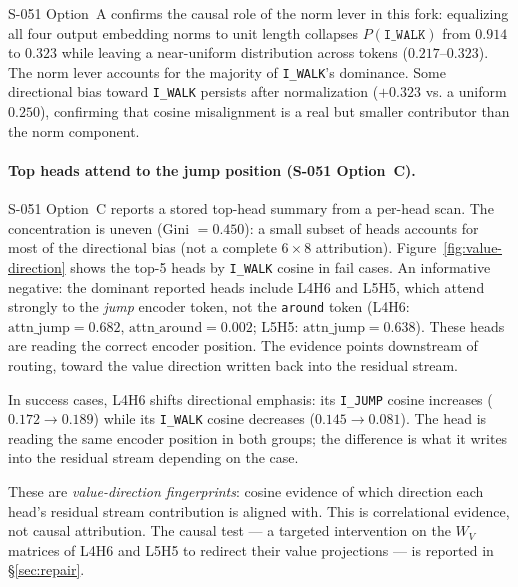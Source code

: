 S-051 Option~A confirms the causal role of the norm lever in this fork:
equalizing all four output embedding norms to unit length collapses
$P(\texttt{I\_WALK})$ from $0.914$ to $0.323$ while leaving a near-uniform
distribution across tokens ($0.217$--$0.323$).
The norm lever accounts for the majority of \texttt{I\_WALK}'s dominance.
Some directional bias toward \texttt{I\_WALK} persists after normalization
($+0.323$ vs. a uniform $0.250$), confirming that cosine misalignment is a
real but smaller contributor than the norm component.

\paragraph{Top heads attend to the jump position (S-051 Option~C).}
S-051 Option~C reports a stored top-head summary from a per-head scan.
The concentration is uneven (Gini $= 0.450$): a small subset of heads accounts
for most of the directional bias (not a complete $6{\times}8$ attribution).
Figure~\ref{fig:value-direction} shows the top-5 heads by \texttt{I\_WALK}
cosine in fail cases.
An informative negative: the dominant reported heads include L4H6 and L5H5, which
attend strongly to the \emph{jump} encoder token, not the \texttt{around} token
(L4H6: $\text{attn\_jump} = 0.682$, $\text{attn\_around} = 0.002$;
L5H5: $\text{attn\_jump} = 0.638$).
These heads are reading the correct encoder position.
The evidence points downstream of routing, toward the value direction written back
into the residual stream.

In success cases, L4H6 shifts directional emphasis: its \texttt{I\_JUMP} cosine
increases ($0.172 \to 0.189$) while its \texttt{I\_WALK} cosine decreases
($0.145 \to 0.081$).
The head is reading the same encoder position in both groups; the difference is
what it writes into the residual stream depending on the case.

These are \emph{value-direction fingerprints}: cosine evidence of which direction
each head's residual stream contribution is aligned with.
This is correlational evidence, not causal attribution.
The causal test --- a targeted intervention on the $W_V$ matrices of L4H6 and L5H5
to redirect their value projections --- is reported in \S\ref{sec:repair}.

